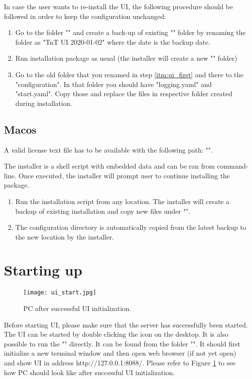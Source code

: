 In case the user wants to re-install the UI, the following procedure should be followed in order to keep the configuration unchanged:
\begin{enumerate}
	\item \label{itm:ui_first} Go to the folder "\tntRootPath"  and create a back-up of existing "\tntUIFolder" folder by renaming the folder as "TnT UI 2020-01-02" where the date is the backup date.
	\item Run installation package as usual (the installer will create a new "\tntUIFolder" folder)
	\item Go to the old folder that you renamed in step \ref{itm:ui_first} and there to the "configuration". In that folder you should have "logging.yaml" and "start.yaml". Copy those and replace the files in respective folder created during installation.
\end{enumerate}

\subsection{Macos}

A valid license text file has to be available with the following path: "\tntLicensePathMacos".

The installer is a shell script with embedded data and can be ran from command-line. Once executed, the installer will prompt user to continue installing the package.
%
\begin{enumerate}
	\item Run the installation script from any location. The installer will create a backup of existing installation and copy new files under "\tntRootPathMacos\tntUIFolder". 
	\item The configuration directory is automatically copied from the latest backup to the new location by the installer.
\end{enumerate}

\section{Starting up}

\begin{figure}[h]
	\centering
	\texttt{[image: ui\_start.jpg]}
	\caption{PC after successful UI initialization.}
	\label{fig:ui_start}
\end{figure}

Before starting UI, please make sure that the server has successfully been started. The UI can be started by double clicking the icon on the desktop. It is also possible to run the "\tntUIExecutable" directly. It can be found from the folder "\tntRootPath\tntUIFolder". It should first initialize a new terminal window and then open web browser (if not yet open) and show UI in address http://127.0.0.1:8088/. Please refer to Figure \ref{fig:ui_start} to see how PC should look like after successful UI initialization.

